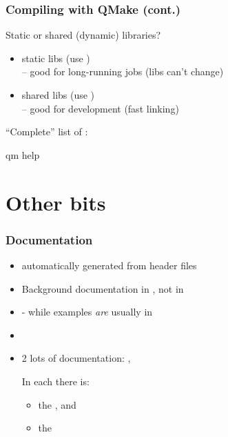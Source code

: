 \documentclass[landscape]{beamer}
\begin{document}
\begin{frame}[fragile]\frametitle{Compiling with QMake (cont.)}

Static or shared (dynamic) libraries?

  \begin{itemize}
  \item static libs (use )\\
    -- good for long-running jobs (libs can't change)
  \pause\item shared libs (use )\\
    -- good for development (fast linking)
  \end{itemize}

\vfill

    \pause ``Complete'' list of :
\begin{VerbatimXterm}
  qm help
\end{VerbatimXterm}

\end{frame}


\section{Other bits}


\begin{frame}\frametitle{Documentation}

  \begin{itemize}
  \item {} automatically generated from header files
  \pause\item Background documentation in , not in
    \\[1em]

  \pause\item - while examples {\em are} usually in \\[1em]

  \pause\item {}\\[1em]

  \pause \item 2 lots of documentation:
  , 

  In each there is: 
  \begin{itemize}
  \pause \item  the , and
  \pause \item the 
  \end{itemize}

  \end{itemize}

\end{frame}
\end{document}
